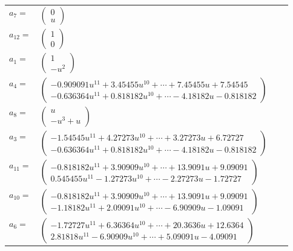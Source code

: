 \documentclass[1p]{elsarticle_modified}
\theoremstyle{definition}
\begin{document}
\begin{tabular}{m{7pt} m{180pt} m{7pt} m{180pt} }
\flushright $a_{7}=$&$\begin{pmatrix}0\\u\end{pmatrix}$ \\
\flushright $a_{12}=$&$\begin{pmatrix}1\\0\end{pmatrix}$ \\
\flushright $a_{1}=$&$\begin{pmatrix}1\\- u^2\end{pmatrix}$ \\
\flushright $a_{4}=$&$\begin{pmatrix}-0.909091 u^{11}+3.45455 u^{10}+\cdots+7.45455 u+7.54545\\-0.636364 u^{11}+0.818182 u^{10}+\cdots-4.18182 u-0.818182\end{pmatrix}$ \\
\flushright $a_{8}=$&$\begin{pmatrix}u\\- u^3+u\end{pmatrix}$ \\
\flushright $a_{3}=$&$\begin{pmatrix}-1.54545 u^{11}+4.27273 u^{10}+\cdots+3.27273 u+6.72727\\-0.636364 u^{11}+0.818182 u^{10}+\cdots-4.18182 u-0.818182\end{pmatrix}$ \\
\flushright $a_{11}=$&$\begin{pmatrix}-0.818182 u^{11}+3.90909 u^{10}+\cdots+13.9091 u+9.09091\\0.545455 u^{11}-1.27273 u^{10}+\cdots-2.27273 u-1.72727\end{pmatrix}$ \\
\flushright $a_{10}=$&$\begin{pmatrix}-0.818182 u^{11}+3.90909 u^{10}+\cdots+13.9091 u+9.09091\\-1.18182 u^{11}+2.09091 u^{10}+\cdots-6.90909 u-1.09091\end{pmatrix}$ \\
\flushright $a_{6}=$&$\begin{pmatrix}-1.72727 u^{11}+6.36364 u^{10}+\cdots+20.3636 u+12.6364\\2.81818 u^{11}-6.90909 u^{10}+\cdots+5.09091 u-4.09091\end{pmatrix}$ \\

\end{tabular}
\end{document}
